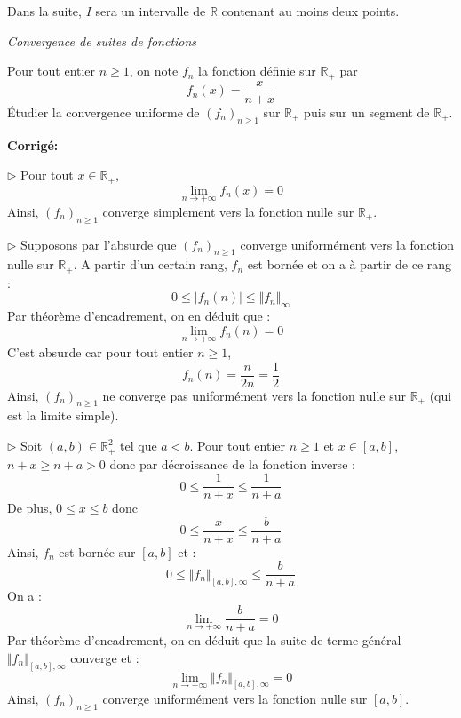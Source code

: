 \documentclass[a4paper,twoside,french,11pt]{VcCours}
\newcommand{\corr}{\textbf{Corrigé:}}
\begin{document}

\tableofcontents
\separationTitre

Dans la suite, $I$ sera un intervalle de $\mathbb{R}$ contenant au moins deux points.

\medskip

\begin{center}
\textit{{ {\large Convergence de suites de fonctions}}}
\end{center}


\begin{Exercice}{} Pour tout entier $n \geq 1$, on note $f_n$ la fonction définie sur $\mathbb{R}_+$ par 
$$ f_n(x) = \frac{x}{n+x}$$
Étudier la convergence uniforme de $(f_n)_{n \geq 1}$ sur $\mathbb{R}_+$ puis sur un segment de $\mathbb{R}_+$.
\end{Exercice}

\corr 

$\rhd$ Pour tout $x \in \mathbb{R}_+$,
$$ \lim_{n \rightarrow + \infty} f_n(x) = 0$$
Ainsi, $(f_n)_{n \geq 1}$ converge simplement vers la fonction nulle sur $\mathbb{R}_+$.

\medskip

$\rhd$ Supposons par l'absurde que $(f_n)_{n \geq 1}$ converge uniformément vers la fonction nulle sur $\mathbb{R}_+$. A partir d'un certain rang, $f_n$ est bornée et on a à partir de ce rang :
$$ 0 \leq \vert f_n(n) \vert \leq \Vert f_n \Vert_{\infty}$$
Par théorème d'encadrement, on en déduit que :
$$ \lim_{n \rightarrow + \infty} f_n(n) = 0$$
C'est absurde car pour tout entier $n \geq 1$,
$$ f_n(n) = \dfrac{n}{2n} = \dfrac{1}{2}$$
Ainsi,  $(f_n)_{n \geq 1}$ ne converge pas uniformément vers la fonction nulle sur $\mathbb{R}_+$ (qui est la limite simple).

\medskip

$\rhd$ Soit $(a,b) \in \mathbb{R}_+^2$ tel que $a <b$. Pour tout entier $n \geq 1$ et $x \in [a,b]$, $n+x \geq n+a>0$ donc par décroissance de la fonction inverse :
$$ 0 \leq \dfrac{1}{n+x} \leq \dfrac{1}{n+a}$$
De plus, $0 \leq x \leq b$ donc 
$$ 0 \leq \dfrac{x}{n+x} \leq \dfrac{b}{n+a}$$
Ainsi, $f_n$ est bornée sur $[a,b]$ et :
$$ 0 \leq \Vert f_n \Vert_{[a,b],\infty} \leq \dfrac{b}{n+a}$$
On a :
$$ \lim_{n \rightarrow + \infty}  \dfrac{b}{n+a} = 0$$
Par théorème d'encadrement, on en déduit que la suite de terme général $\Vert f_n \Vert_{[a,b],\infty}$ converge et :
$$ \lim_{n \rightarrow + \infty} \Vert f_n \Vert_{[a,b],\infty} = 0$$
Ainsi, $(f_n)_{n \geq 1}$ converge uniformément vers la fonction nulle sur $[a,b]$.
\end{document}

